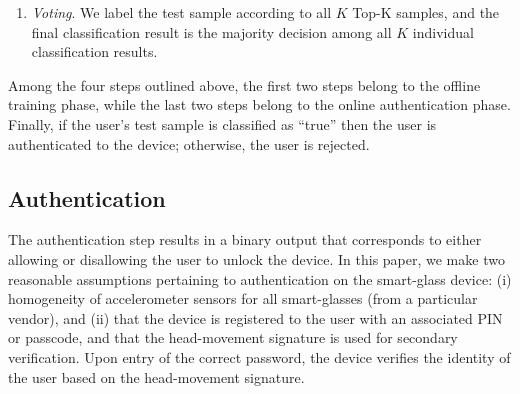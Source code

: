 \begin{enumerate}
\vspace{3pt}\item \emph{Voting}. We label the test sample according to all $K$ Top-K samples, and the final classification result is the majority decision among all $K$ individual classification results.



\end{enumerate}
Among the four steps outlined above, the first two steps belong to the offline training phase, while the last two steps belong to the online authentication phase.
Finally, if the user's test sample is classified as ``true'' then the user is authenticated to the device; otherwise, the user is rejected.


\iffalse
\subsection{Authentication}

The authentication step results in a binary output that corresponds to
either allowing or disallowing the user to unlock the device.
In this paper, we make two reasonable assumptions pertaining to authentication
on the smart-glass device: (i) homogeneity of
accelerometer sensors for all smart-glasses (from a particular vendor), and (ii)
that the device is registered to the user with an associated PIN or passcode,
and that the head-movement signature is used for secondary verification.
Upon entry of the correct password, the device verifies the identity
of the user based on the head-movement signature.

